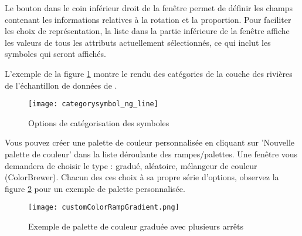 Le bouton  dans le coin inférieur droit de la fenêtre permet de 
définir les champs contenant les informations relatives à la rotation et la 
proportion.
Pour faciliter les choix de représentation, la liste dans la partie inférieure 
de la fenêtre affiche les valeurs de tous les attributs actuellement 
sélectionnés, ce qui inclut les symboles qui seront affichés.

L'exemple de la figure \ref{fig:catsymNG} montre le rendu des catégories de 
la couche des rivières de l'échantillon de données de \qg.

\begin{figure}[ht]
   \centering
   \caption{Options de catégorisation des symboles \nixcaption}\label{fig:catsymNG}
   \texttt{[image: categorysymbol\_ng\_line]}
\end{figure}


Vous pouvez créer une palette de couleur personnalisée en cliquant sur 
'Nouvelle palette de couleur' dans la liste déroulante des rampes/palettes. 
Une fenêtre vous demandera de choisir le type : gradué, aléatoire, mélangeur 
de couleur (ColorBrewer). Chacun des ces choix à sa propre série d'options, 
observez la figure \ref{fig:ccrg} pour un exemple de palette personnalisée.

\begin{figure}[ht]
   \centering
   \caption{Exemple de palette de couleur graduée avec plusieurs arrêts \nixcaption}\label{fig:ccrg}
   \texttt{[image: customColorRampGradient.png]}
\end{figure}

